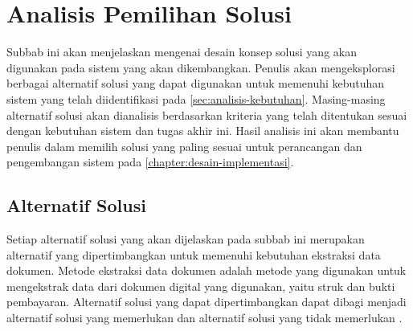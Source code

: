 \section{Analisis Pemilihan Solusi}
\label{sec:analisis-pemilihan-solusi}

Subbab ini akan menjelaskan mengenai desain konsep solusi yang akan digunakan pada sistem yang akan dikembangkan. Penulis akan mengeksplorasi berbagai alternatif solusi yang dapat digunakan untuk memenuhi kebutuhan sistem yang telah diidentifikasi pada \autoref{sec:analisis-kebutuhan}. Masing-masing alternatif solusi akan dianalisis berdasarkan kriteria yang telah ditentukan sesuai dengan kebutuhan sistem dan tugas akhir ini. Hasil analisis ini akan membantu penulis dalam memilih solusi yang paling sesuai untuk perancangan dan pengembangan sistem pada \autoref{chapter:desain-implementasi}.

\subsection{Alternatif Solusi}
\label{subsec:alternatif-solusi}
Setiap alternatif solusi yang akan dijelaskan pada subbab ini merupakan alternatif yang dipertimbangkan untuk memenuhi kebutuhan ekstraksi data dokumen. Metode ekstraksi data dokumen adalah metode yang digunakan untuk mengekstrak data dari dokumen digital yang digunakan, yaitu struk dan bukti pembayaran. Alternatif solusi yang dapat dipertimbangkan dapat dibagi menjadi alternatif solusi yang memerlukan \ocr{} dan alternatif solusi yang tidak memerlukan \ocr. 


